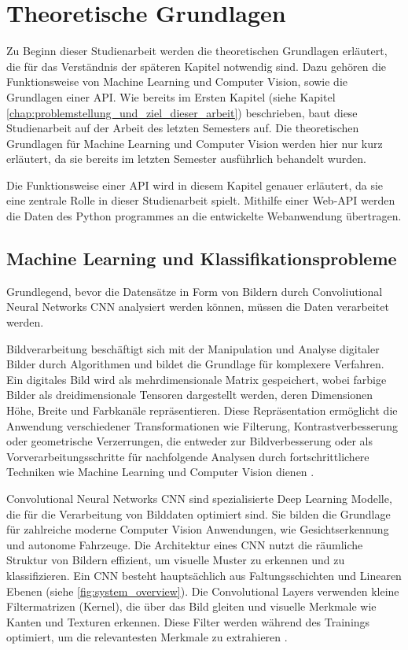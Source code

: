 \chapter{Theoretische Grundlagen} \label{chap:theoretische_grundlagen}  %
Zu Beginn dieser Studienarbeit werden die theoretischen Grundlagen erläutert, die für das Verständnis der späteren Kapitel notwendig sind. Dazu gehören die Funktionsweise von Machine Learning und Computer Vision, sowie die Grundlagen einer API.
Wie bereits im Ersten Kapitel (siehe Kapitel \ref{chap:problemstellung_und_ziel_dieser_arbeit}) beschrieben, baut diese Studienarbeit auf der Arbeit des letzten Semesters auf. 
Die theoretischen Grundlagen für Machine Learning und Computer Vision werden hier nur kurz erläutert, da sie bereits im letzten Semester ausführlich behandelt wurden.

Die Funktionsweise einer API wird in diesem Kapitel genauer erläutert, da sie eine zentrale Rolle in dieser Studienarbeit spielt. Mithilfe einer Web-API werden die Daten
des Python programmes an die entwickelte Webanwendung übertragen.

\section{Machine Learning und Klassifikationsprobleme} \label{sec:ml_cv}  %
Grundlegend, bevor die Datensätze in Form von Bildern durch Convoliutional Neural Networks \ac{CNN} analysiert werden können, müssen die Daten verarbeitet werden.

Bildverarbeitung beschäftigt sich mit der Manipulation und Analyse digitaler Bilder durch Algorithmen und bildet die Grundlage für komplexere Verfahren. 
Ein digitales Bild wird als mehrdimensionale Matrix gespeichert, wobei farbige Bilder als dreidimensionale Tensoren 
dargestellt werden, deren Dimensionen Höhe, Breite und Farbkanäle repräsentieren. 
Diese Repräsentation ermöglicht die Anwendung verschiedener Transformationen wie Filterung, Kontrastverbesserung oder geometrische Verzerrungen, die 
entweder zur Bildverbesserung oder als Vorverarbeitungsschritte für nachfolgende Analysen durch fortschrittlichere Techniken wie Machine Learning und Computer Vision dienen \cite{finbridgede_computer_2022}.

Convolutional Neural Networks \ac{CNN} sind spezialisierte Deep Learning Modelle, die für die Verarbeitung von Bilddaten optimiert sind. Sie bilden die Grundlage für zahlreiche moderne Computer Vision Anwendungen, wie Gesichtserkennung und autonome Fahrzeuge. 
Die Architektur eines CNN nutzt die räumliche Struktur von Bildern effizient, um visuelle Muster zu erkennen und zu klassifizieren.
Ein CNN besteht hauptsächlich aus Faltungsschichten und Linearen Ebenen (siehe \autoref{fig:system_overview}). 
Die Convolutional Layers verwenden kleine Filtermatrizen (Kernel), die über das Bild gleiten und visuelle Merkmale wie Kanten und Texturen erkennen. 
Diese Filter werden während des Trainings optimiert, um die relevantesten Merkmale zu extrahieren \cite{finbridgede_computer_2022} \cite{intel_convolutional_nodate}.


